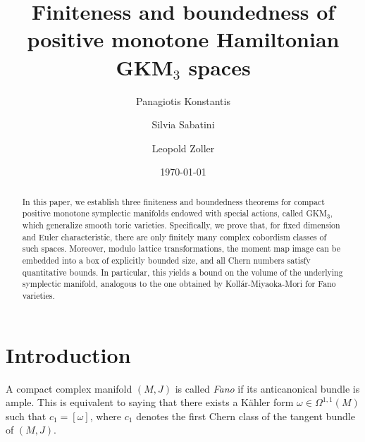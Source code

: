 \documentclass[12pt,a4paper]{amsart}
\title[Finiteness and boundedness of positive monotone Hamiltonian GKM$_3$ spaces]{Finiteness and boundedness of positive monotone Hamiltonian GKM$_3$ spaces}
\author[P. Konstantis]{Panagiotis Konstantis}
\author[S. Sabatini]{Silvia Sabatini}
\author[L. Zoller]{Leopold Zoller}
\date{\today}
\theoremstyle{plain}
\theoremstyle{definition}
\begin{document}
\begin{abstract}

In this paper, we establish three finiteness and boundedness theorems for compact positive monotone symplectic manifolds endowed with special actions, called GKM$_3$, which generalize smooth toric varieties. Specifically, we prove that, for fixed dimension and Euler characteristic, there are only finitely many complex cobordism classes of such spaces. 
Moreover, modulo lattice transformations, the moment map image can be embedded into a box of explicitly bounded size, and all Chern numbers satisfy 
quantitative bounds. In particular, this yields a bound on the volume of the underlying symplectic manifold, analogous to the one obtained by Koll\'{a}r-Miyaoka-Mori for Fano varieties.

 \end{abstract}

\maketitle



\tableofcontents

\section{Introduction}

A compact complex manifold $(M,J)$ is called \textit{Fano} if its anticanonical bundle is ample. This is equivalent to saying that there exists a K\"ahler form $\omega\in \Omega^{1,1}(M)$
such that $c_1=[\omega]$, where $c_1$ denotes the first Chern class of the tangent bundle of $(M,J)$. 
\end{document}
